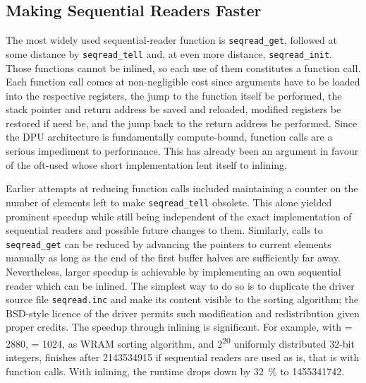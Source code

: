 \subsection{Making Sequential Readers Faster}
\label{sec:mram:merge:faster}

The most widely used sequential-reader function is \lstinline|seqread_get|, followed at some distance by \lstinline|seqread_tell| and, at even more distance, \lstinline|seqread_init|.
Those functions cannot be inlined, so each use of them constitutes a function call.
Each function call comes at non-negligible cost since arguments have to be loaded into the respective registers, the jump to the function itself be performed, the stack pointer and return address be saved and reloaded, modified registers be restored if need be, and the jump back to the return address be performed.
Since the DPU architecture is fundamentally compute-bound, function calls are a serious impediment to performance.
This has already been an argument in favour of the oft-used \IS{} whose short implementation lent itself to inlining.

Earlier attempts at reducing function calls included maintaining a counter on the number of elements left to make \lstinline|seqread_tell| obsolete.
This alone yielded prominent speedup while still being independent of the exact implementation of sequential readers and possible future changes to them.
Similarly, calls to \lstinline|seqread_get| can be reduced by advancing the pointers to current elements manually as long as the end of the first buffer halves are sufficiently far away.
Nevertheless, larger speedup is achievable by implementing an own sequential reader which can be inlined.
The simplest way to do so is to duplicate the driver source file \lstinline|seqread.inc| and make its content visible to the sorting algorithm;
the BSD-style licence of the driver permits such modification and redistribution given proper credits.
The speedup through inlining is significant.
For example, with \cachesize{} = 2880, \seqreadcachesize{} = 1024, \QS{} as WRAM sorting algorithm, and 2\textsuperscript{20} uniformly distributed 32-bit integers, \MS{} finishes after \qty[exponent-mode=engineering, round-mode=places, round-precision=2]{2143534915}{\cycle} if sequential readers are used as is, that is with function calls.
With inlining, the runtime drops down by \qty{32}{\percent} to \qty[exponent-mode=engineering, round-mode=places, round-precision=2]{1455341742}{\cycle}.


